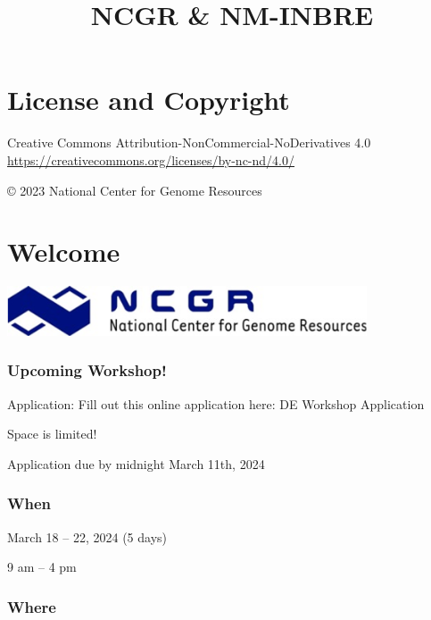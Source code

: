 \documentclass[
]{book}
\title{NCGR \& NM-INBRE}
\author{}
\date{\vspace{-2.5em}}
\begin{document}
\maketitle

{
\setcounter{tocdepth}{1}
\tableofcontents
}
\hypertarget{license-and-copyright}{%
\chapter*{License and Copyright}\label{license-and-copyright}}

Creative Commons Attribution-NonCommercial-NoDerivatives 4.0
\url{https://creativecommons.org/licenses/by-nc-nd/4.0/}

© 2023 National Center for Genome Resources

\hypertarget{welcome}{%
\chapter*{Welcome}\label{welcome}}

\includegraphics[width=0.8\textwidth,height=\textheight]{./Figures/ncgr.png}

\hypertarget{upcoming-workshop}{%
\subsection*{Upcoming Workshop!}\label{upcoming-workshop}}

Application: Fill out this online application here: DE Workshop Application

Space is limited!

Application due by midnight March 11th, 2024

\hypertarget{when}{%
\subsection*{When}\label{when}}

March 18 -- 22, 2024 (5 days)

9 am -- 4 pm

\hypertarget{where}{%
\subsection*{Where}\label{where}}
\end{document}

